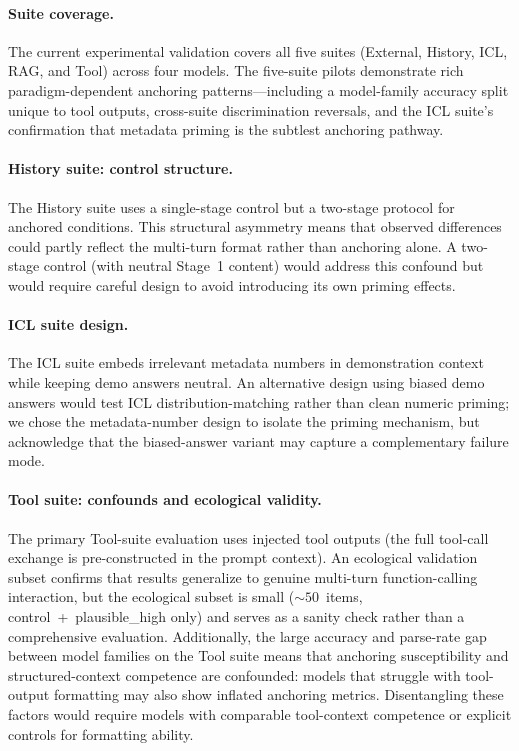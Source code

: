 \paragraph{Suite coverage.}
The current experimental validation covers all five suites
(External, History, ICL, RAG, and Tool) across four models.
The five-suite pilots demonstrate rich paradigm-dependent
anchoring patterns---including a model-family accuracy split
unique to tool outputs, cross-suite discrimination reversals,
and the ICL suite's confirmation that metadata priming is the
subtlest anchoring pathway.

\paragraph{History suite: control structure.}
The History suite uses a single-stage control but a two-stage
protocol for anchored conditions.
This structural asymmetry means that observed differences could
partly reflect the multi-turn format rather than anchoring
alone.
A two-stage control (with neutral Stage~1 content) would
address this confound but would require careful design to
avoid introducing its own priming effects.

\paragraph{ICL suite design.}
The ICL suite embeds irrelevant metadata numbers in
demonstration context while keeping demo answers neutral.
An alternative design using biased demo answers would test
ICL distribution-matching rather than clean numeric priming;
we chose the metadata-number design to isolate the priming
mechanism, but acknowledge that the biased-answer variant
may capture a complementary failure mode.

\paragraph{Tool suite: confounds and ecological validity.}
The primary Tool-suite evaluation uses injected tool outputs
(the full tool-call exchange is pre-constructed in the prompt
context).
An ecological validation subset confirms that results
generalize to genuine multi-turn function-calling interaction,
but the ecological subset is small (${\sim}50$~items,
control~+~plausible\_high only) and serves as a sanity check
rather than a comprehensive evaluation.
Additionally, the large accuracy and parse-rate gap between
model families on the Tool suite means that anchoring
susceptibility and structured-context competence are
confounded: models that struggle with tool-output formatting
may also show inflated anchoring metrics.
Disentangling these factors would require models with
comparable tool-context competence or explicit controls for
formatting ability.

